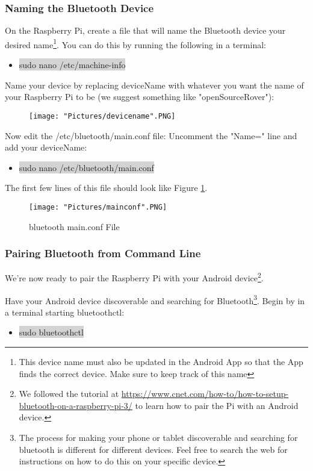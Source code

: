 \documentclass[12pt]{article}
\begin{document}
\subsubsection{Naming the Bluetooth Device}

On the Raspberry Pi, create a file that will name the Bluetooth device your desired name\footnote{This device name must also be updated in the Android App so that the App finds the correct device. Make sure to keep track of this name}. You can do this by running the following in a terminal: 
\begin{itemize}
	\item[] \colorbox{lightgray}{sudo nano /etc/machine-info} 
\end{itemize}
\noindent Name your device by replacing deviceName with whatever you want the name of your Raspberry Pi to be (we suggest something like "openSourceRover"):

\begin{figure}[H]
 	\centering
	\texttt{[image: "Pictures/devicename".PNG]}
\end{figure}

\noindent Now edit the /etc/bluetooth/main.conf file: Uncomment the "Name=" line and add your deviceName: 
\begin{itemize}
	\item[] \colorbox{lightgray}{sudo nano /etc/bluetooth/main.conf} 
\end{itemize}

\noindent The first few lines of this file should look like Figure \ref{conf}.

\begin{figure}[H]
 	\centering
	\texttt{[image: "Pictures/mainconf".PNG]}
	\caption{bluetooth main.conf File}
	\label{conf}
\end{figure}

\subsubsection{Pairing Bluetooth from Command Line}
We're now ready to pair the Raspberry Pi with your Android device\footnote{We followed the tutorial at \href{https://www.cnet.com/how-to/how-to-setup-bluetooth-on-a-raspberry-pi-3/}{https://www.cnet.com/how-to/how-to-setup-bluetooth-on-a-raspberry-pi-3/} to learn how to pair the Pi with an Android device.}.

Have your Android device discoverable and searching for Bluetooth\footnote{The process for making your phone or tablet discoverable and searching for bluetooth is different for different devices. Feel free to search the web for instructions on how to do this on your specific device.}. Begin by in a terminal starting bluetoothctl:
\begin{itemize}
	\item[] \colorbox{lightgray}{sudo bluetoothctl}
\end{itemize}
\end{document}
